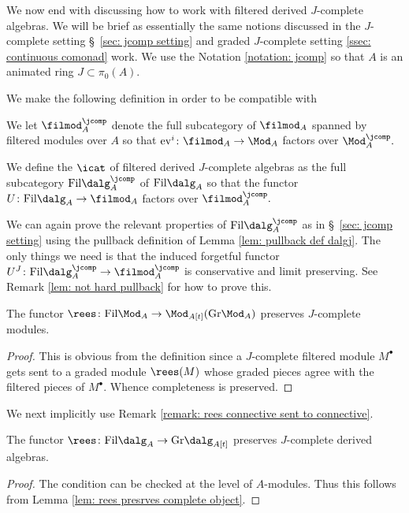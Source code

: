\documentclass[10pt,reqno]{amsart}
\numberwithin{equation}{section}
\newcommand{\Gr}{\mathrm{Gr}}
\newcommand{\ev}{\mathrm{ev}}
\newcommand{\fil}{\mathrm{Fil}}
\begin{document}
We now end with discussing how to work with filtered derived $J$-complete algebras. We will be brief as essentially the same notions discussed in the $J$-complete setting \S~\ref{sec: jcomp setting} and graded $J$-complete setting \ref{ssec: continuous comonad} work. We use the Notation \ref{notation: jcomp} so that $A$ is an animated ring $J\subset \pi_0(A)$.

We make the following definition in order to be compatible with \cite[Notation D.12]{APC}

\begin{recollection}\label{rec: filteredjcomp}
    We let $\filmod^\jcomp_A$ denote the full subcategory of $\filmod_A$ spanned by filtered modules over $A$ so that $\ev^i\colon \filmod_A\to \Mod_A$ factors over $\Mod_A^\jcomp.$
\end{recollection}

\begin{definition}
    We define the $\icat$ of filtered derived $J$-complete algebras as the full subcategory $\fil\dalg_A^\jcomp$ of $\fil\dalg_A$ so that the functor $U\colon \fil\dalg_A\to \filmod_A$ factors over $\filmod_A^\jcomp.$ 
\end{definition}

\begin{remark}
    We can again prove the relevant properties of $\fil\dalg_A^\jcomp$ as in \S~\ref{sec: jcomp setting} using the pullback definition of Lemma \ref{lem: pullback def dalgj}. The only things we need is that the induced forgetful functor $U^J\colon \fil\dalg_A^\jcomp\to \filmod_A^\jcomp$ is conservative and limit preserving. See Remark \ref{lem: not hard pullback} for how to prove this.
\end{remark}


\begin{lemma}\label{lem: rees presrves complete object}
    The functor $\rees\colon \fil\Mod_A\to \Mod_{A[t]}(\Gr\Mod_A)$ preserves $J$-complete modules.
\end{lemma}
\begin{proof}
    This is obvious from the definition since a $J$-complete filtered module $M^\bullet$ gets sent to a graded module $\rees(M)$ whose graded pieces agree with the filtered pieces of $M^\bullet$. Whence completeness is preserved. 
\end{proof}

We next implicitly use Remark \ref{remark: rees connective sent to connective}.

\begin{corollary}\label{cor: rees preserves complete dalg}
    The functor $\rees\colon \fil\dalg_A\to \Gr\dalg_{A[t]}$ preserves $J$-complete derived algebras.
\end{corollary}
\begin{proof}
    The condition can be checked at the level of $A$-modules. Thus this follows from Lemma \ref{lem: rees presrves complete object}.
\end{proof}
\end{document}
